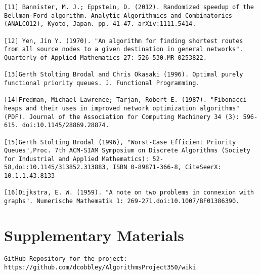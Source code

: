 \documentclass{article}
\begin{document}
\begin{lstlisting}
[11] Bannister, M. J.; Eppstein, D. (2012). Randomized speedup of the Bellman-Ford algorithm. Analytic Algorithmics and Combinatorics (ANALCO12), Kyoto, Japan. pp. 41-47. arXiv:1111.5414.

[12] Yen, Jin Y. (1970). "An algorithm for finding shortest routes from all source nodes to a given destination in general networks". Quarterly of Applied Mathematics 27: 526-530.MR 0253822.

[13]Gerth Stolting Brodal and Chris Okasaki (1996). Optimal purely functional priority queues. J. Functional Programming.

[14]Fredman, Michael Lawrence; Tarjan, Robert E. (1987). "Fibonacci heaps and their uses in improved network optimization algorithms"(PDF). Journal of the Association for Computing Machinery 34 (3): 596-615. doi:10.1145/28869.28874.

[15]Gerth Stolting Brodal (1996), "Worst-Case Efficient Priority Queues",Proc. 7th ACM-SIAM Symposium on Discrete Algorithms (Society for Industrial and Applied Mathematics): 52-58,doi:10.1145/313852.313883, ISBN 0-89871-366-8, CiteSeerX: 10.1.1.43.8133

[16]Dijkstra, E. W. (1959). "A note on two problems in connexion with graphs". Numerische Mathematik 1: 269-271.doi:10.1007/BF01386390.

\end{lstlisting}

\section{Supplementary Materials}
\begin{verbatim}
GitHub Repository for the project:
https://github.com/dcobbley/AlgorithmsProject350/wiki
\end{verbatim}
\end{document}
